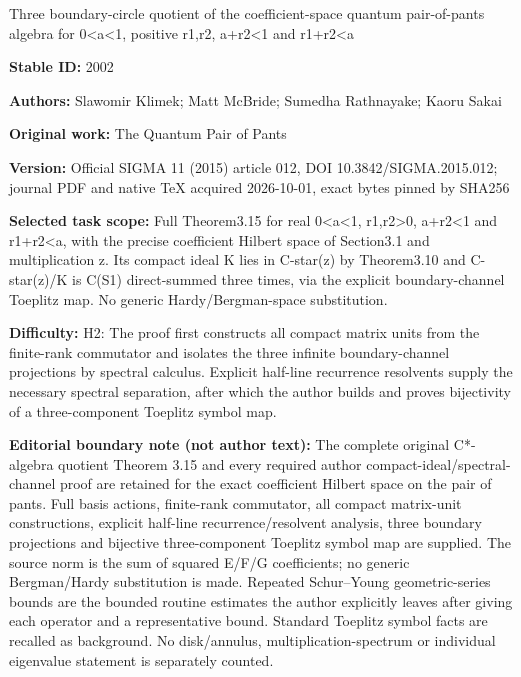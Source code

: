 \documentclass[11pt]{article}
\numberwithin{equation}{section}
\begin{document}
\begin{center}\Large Three boundary-circle quotient of the coefficient-space quantum pair-of-pants algebra for 0<a<1, positive r1,r2, a+\allowbreak{}r2<1 and r1+\allowbreak{}r2<a\end{center}
\noindent\textbf{Stable ID:} 2002\par
\noindent\textbf{Authors:} Slawomir Klimek; Matt McBride; Sumedha Rathnayake; Kaoru Sakai\par
\noindent\textbf{Original work:} The Quantum Pair of Pants\par
\noindent\textbf{Version:} Official SIGMA 11 (2015) article 012, DOI 10.3842/SIGMA.2015.012; journal PDF and native TeX acquired 2026-10-01, exact bytes pinned by SHA256\par
\noindent\textbf{Selected task scope:} Full Theorem3.15 for real 0<a<1, r1,r2>0, a+\allowbreak{}r2<1 and r1+\allowbreak{}r2<a, with the precise coefficient Hilbert space of Section3.1 and multiplication z. Its compact ideal K lies in C-star(z) by Theorem3.10 and C-star(z)/K is C(S1) direct-summed three times, via the explicit boundary-channel Toeplitz map. No generic Hardy/Bergman-space substitution.\par
\noindent\textbf{Difficulty:} H2: The proof first constructs all compact matrix units from the finite-rank commutator and isolates the three infinite boundary-channel projections by spectral calculus. Explicit half-line recurrence resolvents supply the necessary spectral separation, after which the author builds and proves bijectivity of a three-component Toeplitz symbol map.\par
\noindent\textbf{Editorial boundary note (not author text):} The complete original C*\allowbreak{}-algebra quotient Theorem 3.15 and every required author compact-ideal/spectral-channel proof are retained for the exact coefficient Hilbert space on the pair of pants. Full basis actions, finite-rank commutator, all compact matrix-unit constructions, explicit half-line recurrence/resolvent analysis, three boundary projections and bijective three-component Toeplitz symbol map are supplied. The source norm is the sum of squared E/F/G coefficients; no generic Bergman/Hardy substitution is made. Repeated Schur–Young geometric-series bounds are the bounded routine estimates the author explicitly leaves after giving each operator and a representative bound. Standard Toeplitz symbol facts are recalled as background. No disk/annulus, multiplication-spectrum or individual eigenvalue statement is separately counted.\par
\end{document}
